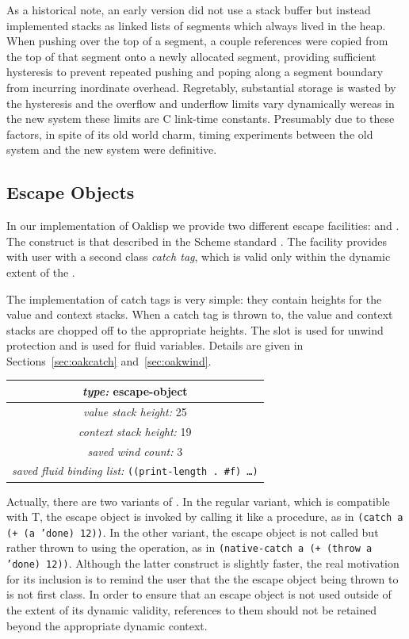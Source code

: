 As a historical note, an early version did not use a stack buffer but
instead implemented stacks as linked lists of segments which always
lived in the heap.  When pushing over the top of a segment, a couple
references were copied from the top of that segment onto a newly
allocated segment, providing sufficient hysteresis to prevent repeated
pushing and poping along a segment boundary from incurring inordinate
overhead.  Regretably, substantial storage is wasted by the hysteresis
and the overflow and underflow limits vary dynamically wereas in the
new system these limits are C link-time constants.  Presumably due to
these factors, in spite of its old world charm, timing experiments
between the old system and the new system were definitive.


\subsection{Escape Objects} \label{sec:ctagform}

In our implementation of Oaklisp we provide two different escape
facilities:  and .  The  construct
is that described in the Scheme standard \citep{R3RS}.  The 
facility provides with user with a second class \emph{catch tag}, which
is valid only within the dynamic extent of the .

The implementation of catch tags is very simple: they contain heights
for the value and context stacks.  When a catch tag is thrown to, the
value and context stacks are chopped off to the appropriate heights.
The slot  is used for unwind protection and
 is used for fluid variables.  Details
are given in Sections~\ref{sec:oakcatch} and~\ref{sec:oakwind}.

\begin{center}
\begin{tabular}{|c|}\hline
\emph{type:} escape-object \\\hline
\emph{value stack height:} 25 \\\hline
\emph{context stack height:} 19 \\\hline
\emph{saved wind count:} 3 \\\hline
\emph{saved fluid binding list:} \tt ((print-length . \#f) \ldots)\\\hline
\end{tabular}
\end{center}

Actually, there are two variants of .  In the regular
variant, which is compatible with T, the escape object is invoked by
calling it like a procedure, as in \texttt{(catch a (+ (a 'done) 12))}.
In the other variant, the escape object is not called but rather
thrown to using the  operation, as in \texttt{(native-catch a
(+ (throw a 'done) 12))}.  Although the latter construct is slightly
faster, the real motivation for its inclusion is to remind the user
that the the escape object being thrown to is not first class.  In
order to ensure that an escape object is not used outside of the
extent of its dynamic validity, references to them should not be
retained beyond the appropriate dynamic context.


